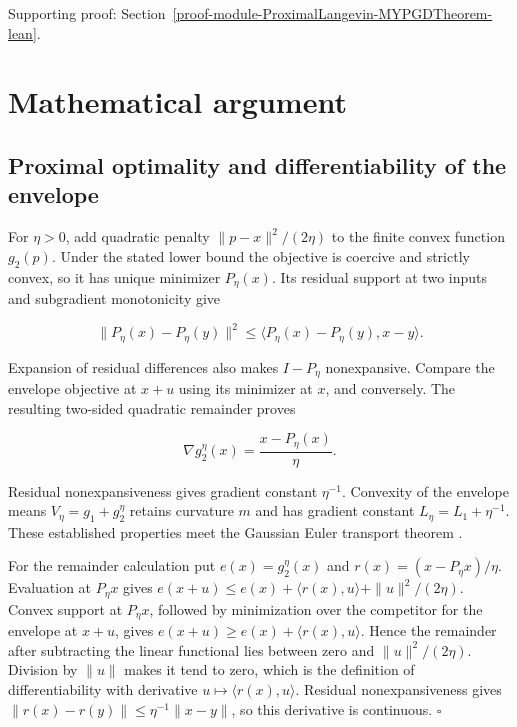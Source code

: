 \documentclass[11pt,a4paper]{report}
\begin{document}
{\small\color{gray}Supporting proof: Section~\ref{proof-module-ProximalLangevin-MYPGDTheorem-lean}.\par}
\chapter{Mathematical argument}
\section{\texorpdfstring{Proximal optimality and differentiability of the envelope}{Proximal optimality and differentiability of the envelope}}



For \(\eta>0\), add quadratic penalty \(\|p-x\|^2/(2\eta)\) to the finite convex function \(g_2(p)\). Under the stated lower bound the objective is coercive and strictly convex, so it has unique minimizer \(P_\eta(x)\). Its residual support at two inputs and subgradient monotonicity give

\[\|P_\eta(x)-P_\eta(y)\|^2\le
\langle P_\eta(x)-P_\eta(y),x-y\rangle.\]

Expansion of residual differences also makes \(I-P_\eta\) nonexpansive. Compare the envelope objective at \(x+u\) using its minimizer at \(x\), and conversely. The resulting two-sided quadratic remainder proves

\[\nabla g_2^\eta(x)=\frac{x-P_\eta(x)}\eta.\]

Residual nonexpansiveness gives gradient constant \(\eta^{-1}\). Convexity of the envelope means \(V_\eta=g_1+g_2^\eta\) retains curvature \(m\) and has gradient constant \(L_\eta=L_1+\eta^{-1}\). These established properties meet the Gaussian Euler transport theorem \cite[Section~3.45.7]{LangevinLean2026ULASC}.




For the remainder calculation put \(e(x)=g_2^\eta(x)\) and \(r(x)=(x-P_\eta x)/\eta\). Evaluation at \(P_\eta x\) gives \(e(x+u)\le e(x)+\langle r(x),u\rangle+\|u\|^2/(2\eta)\). Convex support at \(P_\eta x\), followed by minimization over the competitor for the envelope at \(x+u\), gives \(e(x+u)\ge e(x)+\langle r(x),u\rangle\). Hence the remainder after subtracting the linear functional lies between zero and \(\|u\|^2/(2\eta)\). Division by \(\|u\|\) makes it tend to zero, which is the definition of differentiability with derivative \(u\mapsto\langle r(x),u\rangle\). Residual nonexpansiveness gives \(\|r(x)-r(y)\|\le\eta^{-1}\|x-y\|\), so this derivative is continuous. \(\square\)
\end{document}
